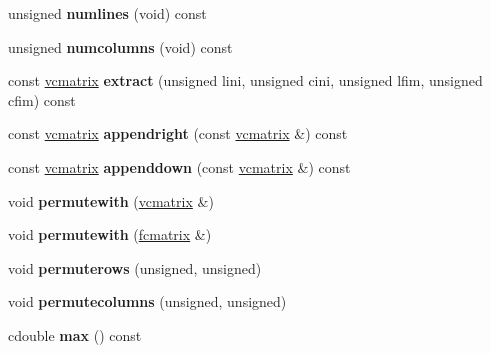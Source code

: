 \begin{DoxyCompactItemize}
\item 
unsigned {\bfseries numlines} (void) const \hypertarget{classvcmatrix_adba117fac973f1448b6b279f407a30fe}{}\label{classvcmatrix_adba117fac973f1448b6b279f407a30fe}

\item 
unsigned {\bfseries numcolumns} (void) const \hypertarget{classvcmatrix_abdf315f90b449bce2eccb0c922dbc30c}{}\label{classvcmatrix_abdf315f90b449bce2eccb0c922dbc30c}

\item 
const \hyperlink{classvcmatrix}{vcmatrix} {\bfseries extract} (unsigned lini, unsigned cini, unsigned lfim, unsigned cfim) const \hypertarget{classvcmatrix_a18e318cf78397f1bc3c15e438e21e18d}{}\label{classvcmatrix_a18e318cf78397f1bc3c15e438e21e18d}

\item 
const \hyperlink{classvcmatrix}{vcmatrix} {\bfseries appendright} (const \hyperlink{classvcmatrix}{vcmatrix} \&) const \hypertarget{classvcmatrix_aa9a0fa320e4c613feaf0a45e70dfb979}{}\label{classvcmatrix_aa9a0fa320e4c613feaf0a45e70dfb979}

\item 
const \hyperlink{classvcmatrix}{vcmatrix} {\bfseries appenddown} (const \hyperlink{classvcmatrix}{vcmatrix} \&) const \hypertarget{classvcmatrix_a2126b3ac35b29cbeed07a97c35bf858d}{}\label{classvcmatrix_a2126b3ac35b29cbeed07a97c35bf858d}

\item 
void {\bfseries permutewith} (\hyperlink{classvcmatrix}{vcmatrix} \&)\hypertarget{classvcmatrix_a2e00089799218b32593387e3aa880dbc}{}\label{classvcmatrix_a2e00089799218b32593387e3aa880dbc}

\item 
void {\bfseries permutewith} (\hyperlink{classfcmatrix}{fcmatrix} \&)\hypertarget{classvcmatrix_a1bdfdb48ca6b2b8c4874b47e41e7a048}{}\label{classvcmatrix_a1bdfdb48ca6b2b8c4874b47e41e7a048}

\item 
void {\bfseries permuterows} (unsigned, unsigned)\hypertarget{classvcmatrix_a0b19f12b3a68410fbe2bb83c2841872a}{}\label{classvcmatrix_a0b19f12b3a68410fbe2bb83c2841872a}

\item 
void {\bfseries permutecolumns} (unsigned, unsigned)\hypertarget{classvcmatrix_a24c354ffa19563e8162f2112b7885fc8}{}\label{classvcmatrix_a24c354ffa19563e8162f2112b7885fc8}

\item 
cdouble {\bfseries max} () const \hypertarget{classvcmatrix_a9be4d1f97c88ec2f9301e7db741286b3}{}\label{classvcmatrix_a9be4d1f97c88ec2f9301e7db741286b3}


\end{DoxyCompactItemize}
